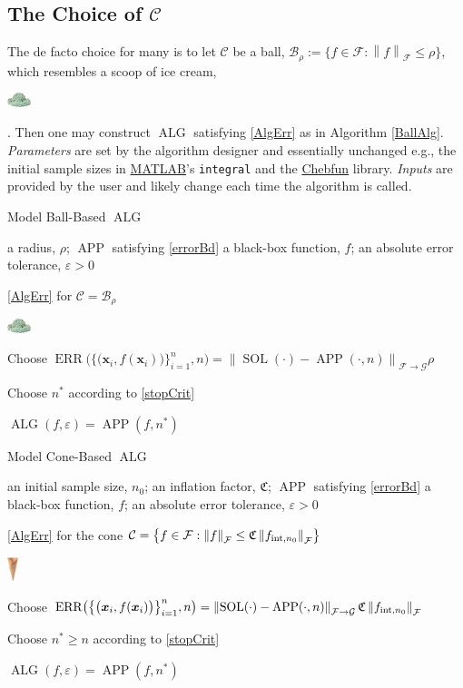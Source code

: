 \documentclass[11pt]{NSFamsart}
\newcommand{\MATLAB}{\hyperlink{MATLABlink}{MATLAB}\xspace}
\newcommand{\Chebfun}{\hyperlink{Chebfunlink}{Chebfun}\xspace}
\DeclareMathOperator{\SOL}{SOL}
\DeclareMathOperator{\APP}{APP}
\DeclareMathOperator{\ALG}{ALG}
\DeclareMathOperator{\ERR}{ERR}
\newcommand{\bx}{{\boldsymbol{x}}}
\newcommand{\cc}{\mathcal{C}}
\newcommand{\cb}{\mathcal{B}}
\newcommand{\calc}{{\mathcal{C}}}
\newcommand{\calf}{{\mathcal{F}}}
\newcommand{\calg}{{\mathcal{G}}}
\newcommand{\fC}{\mathfrak{C}}
\newcommand{\norm}[2][{}]{\ensuremath{\left \lVert #2 \right \rVert}_{#1}}
\newcommand{\dataN}{\bigl\{\bigl(\bx_i,f(\bx_i)\bigr)\bigr\}_{i=1}^n}
\newcommand{\ErrN}{\ERR\bigl(\dataN,n\bigr)}
\newcommand{\inflate}{\fC}
\newcommand{\smallerscoop}{\parbox{0.7cm}{\includegraphics[width=0.7cm]{ProgramsImages/IceCreamScoop.eps}}\xspace}
\newcommand{\smallcone}{\parbox{0.7cm}{\includegraphics[width=0.32cm,angle=270]{ProgramsImages/MediumWaffleCone.eps}}\xspace}
\begin{document}
\subsection{The Choice of $\calc$} \label{sec:CChoice}

The de facto choice for many is to let $\calc$ be a ball, $\cb_{\rho} := \{f \in \calf : \norm[\calf]{f} \le \rho \}$, which resembles a scoop of ice cream, \smallerscoop.  Then one may construct $\ALG$ satisfying \eqref{AlgErr} as in Algorithm \ref{BallAlg}. \emph{Parameters} are set by the algorithm designer and essentially unchanged e.g., the initial sample sizes in \MATLAB's \texttt{integral} and the \Chebfun library.  \emph{Inputs} are provided by the user and likely change each time the algorithm is called.

\begin{algorithm}
	\caption{Model Ball-Based $\ALG$ \label{BallAlg}} 
	\begin{algorithmic}
	\PARAM a radius, $\rho$; $\APP$ satisfying \eqref{errorBd}
		\INPUT a black-box function, $f$; an absolute error tolerance,
		$\varepsilon>0$

\Ensure \eqref{AlgErr} for $\cc = \cb_{\rho}$\smallerscoop

\State Choose $\ErrN = \norm[\calf \to \calg]{\SOL(\cdot) - \APP(\cdot,n)} \rho$ 

\State Choose $n^*$ according to \eqref{stopCrit}

\RETURN $\ALG(f,\varepsilon) = \APP(f,n^*)$
\end{algorithmic}
\end{algorithm}

\begin{algorithm}
	\caption{Model Cone-Based $\ALG$ \label{ConeAlg}} 
	\begin{algorithmic}
	\PARAM an initial sample size, $n_0$; an inflation factor, $\fC$; $\APP$ satisfying \eqref{errorBd}
		\INPUT a black-box function, $f$; an absolute error tolerance,
		$\varepsilon>0$

\Ensure \eqref{AlgErr} for  the cone $\cc = \bigl\{f \in \calf : \norm[\calf]{f} \le \inflate \norm[\calf]{f_{\textup{int},n_0}} \bigr \}$\smallcone

\State Choose $\ErrN = \norm[\calf \to \calg]{\SOL(\cdot) - \APP(\cdot,n)} \inflate \norm[\calf]{f_{\textup{int},n_0}}$ \\ 

\State Choose $n^* \ge n$ according to \eqref{stopCrit}

\RETURN $\ALG(f,\varepsilon) = \APP(f,n^*)$
\end{algorithmic}
\end{algorithm}
\end{document}
